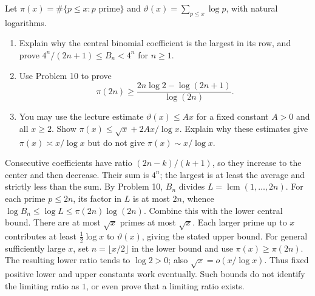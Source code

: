 Let $\pi(x)=\#\{p\le x:p\text{ prime}\}$ and
$\vartheta(x)=\sum_{p\le x}\log p$, with natural logarithms.
\begin{enumerate}
\item Explain why the central binomial coefficient is the largest in
its row, and prove $4^n/(2n+1)\le B_n<4^n$ for $n\ge1$. 
\item Use Problem 10 to prove 
\[
\pi(2n)\ge\frac{2n\log2-\log(2n+1)}{\log(2n)}.
\]
\item You may use the lecture estimate $\vartheta(x)\le Ax$ for a fixed
constant $A>0$ and all $x\ge2$. Show
$\pi(x)\le\sqrt x+2Ax/\log x$.
Explain why these estimates give $\pi(x)\asymp x/\log x$ but do not
give $\pi(x)\sim x/\log x$. 
\end{enumerate}
\begin{solution}
Consecutive coefficients have ratio $(2n-k)/(k+1)$, so they increase
to the center and then decrease. Their sum is $4^n$; the largest is at
least the average and strictly less than the sum.
By Problem 10, $B_n$ divides $L=\operatorname{lcm}(1,\ldots,2n)$.
For each prime $p\le2n$, its factor in $L$ is at most $2n$, whence
$\log B_n\le\log L\le\pi(2n)\log(2n)$.
Combine this with the lower central bound.
There are at most $\sqrt x$ primes at most $\sqrt x$. Each larger prime
up to $x$ contributes at least $\tfrac12\log x$ to $\vartheta(x)$,
giving the stated upper bound. For general sufficiently large $x$,
set $n=\lfloor x/2\rfloor$ in the lower bound and use
$\pi(x)\ge\pi(2n)$. The resulting lower ratio tends to $\log2>0$;
also $\sqrt x=o(x/\log x)$. Thus fixed positive lower and upper
constants work eventually. Such bounds do not identify the limiting
ratio as $1$, or even prove that a limiting ratio exists.
\end{solution}

